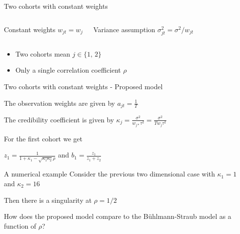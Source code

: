\documentclass{beamer}
\begin{document}
\begin{frame}{Two cohorts with constant weights}
\begin{columns}
    \begin{block}{Constant weights}
    $w_{jt}=w_j$
    \end{block}
    \begin{block}{Variance assumption}
    $\sigma_{jt}^2 = \sigma^2/w_{jt}$
    \end{block}
\end{columns}

\vspace{0.5cm}

\begin{itemize}
    \item Two cohorts mean $j\in \{1,\, 2\}$
    \item Only a single correlation coefficient $\rho$
\end{itemize}
    
\end{frame}


\begin{frame}{Two cohorts with constant weights - Proposed model}

The observation weights are given by $a_{jt}=\frac{1}{T}$

\vspace{0.5cm}

The credibility coefficient is given by $\kappa_j = \frac{\sigma^2}{w_{j\ast}\tau^2} = \frac{\sigma^2}{Tw_j\tau^2}$

\vspace{0.5cm}

For the first cohort we get

\vspace{0.25cm}

$z_1 = \frac{1}{1+\kappa_1 -\sqrt{\kappa_1\kappa_2}\rho}$ and $b_1 =  \frac{z_1}{z_1+z_2}$
    
\end{frame}

\begin{frame}{A numerical example}
Consider the previous two dimensional case with $\kappa_1=1$ and $\kappa_2 = 16$

\vspace{0.5cm}

Then there is a singularity at $\rho=1/2$

\vspace{0.5cm}

How does the proposed model compare to the Bühlmann-Straub model as a function of $\rho$?
    
\end{frame}
\end{document}
